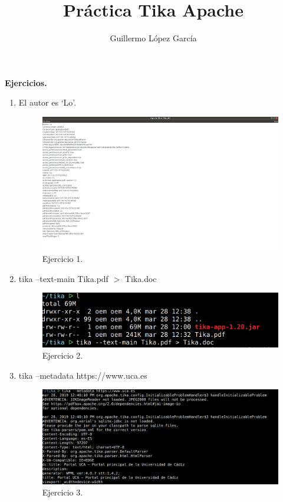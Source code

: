 \documentclass{article}
\title{Práctica Tika Apache}
\author{Guillermo López García}
\begin{document}
\maketitle


\textbf{Ejercicios.}
\begin{enumerate}
    \item El autor es `Lo'.
        \begin{figure}[H]
        \centering
        \includegraphics[width=0.7\linewidth]{./ej1}
        \caption{Ejercicio 1.}
        \end{figure}
    \item tika --text-main Tika.pdf $>$ Tika.doc
        \begin{figure}[H]
        \centering
        \includegraphics[width=0.7\linewidth]{./ej2}
        \caption{Ejercicio 2.}
        \end{figure}
    \item tika --metadata https://www.uca.es
        \begin{figure}[H]
        \centering
        \includegraphics[width=0.7\linewidth]{./ej3}
        \caption{Ejercicio 3.}
        \end{figure}

\end{enumerate}
\end{document}

